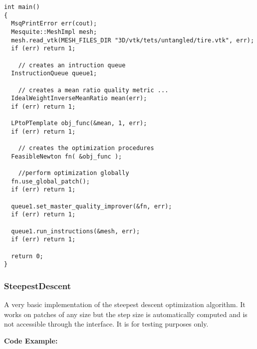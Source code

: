 \begin{lstlisting}[frame=single]
int main()
{     
  MsqPrintError err(cout);
  Mesquite::MeshImpl mesh;
  mesh.read_vtk(MESH_FILES_DIR "3D/vtk/tets/untangled/tire.vtk", err);
  if (err) return 1;
  
    // creates an intruction queue
  InstructionQueue queue1;

    // creates a mean ratio quality metric ...
  IdealWeightInverseMeanRatio mean(err);
  if (err) return 1;
  
  LPtoPTemplate obj_func(&mean, 1, err);
  if (err) return 1;
  
    // creates the optimization procedures
  FeasibleNewton fn( &obj_func );

    //perform optimization globally
  fn.use_global_patch();
  if (err) return 1;
  
  queue1.set_master_quality_improver(&fn, err); 
  if (err) return 1;

  queue1.run_instructions(&mesh, err); 
  if (err) return 1;
  
  return 0;
}
\end{lstlisting}


\subsubsection{SteepestDescent}
A very basic implementation of the steepest descent optimization algorithm.  It works on patches of any size but the step size is automatically computed and is not accessible through the interface. It is for testing purposes only. 

\textbf{Code Example:}

